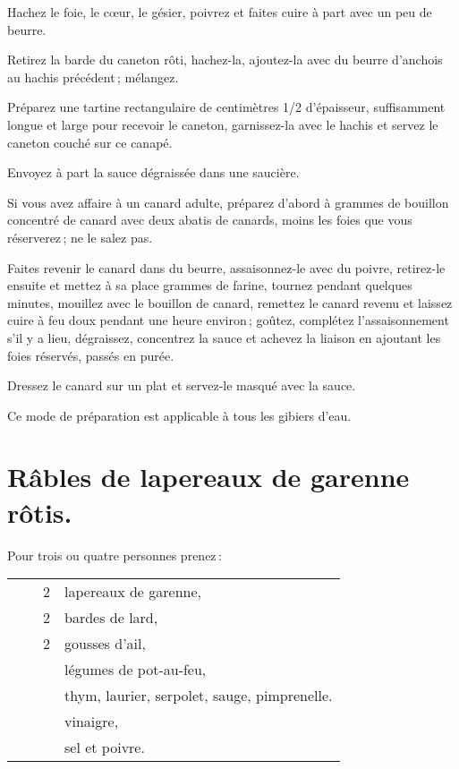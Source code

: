 Hachez le foie, le cœur, le gésier, poivrez et faites cuire à part avec un peu
de beurre.

Retirez la barde du caneton rôti, hachez-la, ajoutez-la avec du beurre
d'anchois au hachis précédent ; mélangez.

Préparez une tartine rectangulaire de {\mmm} centimètres 1/2 d'épaisseur,
suffisamment longue et large pour recevoir le caneton, garnissez-la avec le
hachis et servez le caneton couché sur ce canapé.

Envoyez à part la sauce dégraissée dans une saucière.

\sk

Si vous avez affaire à un canard adulte, préparez d'abord {\mmm}
à {\mmm} grammes de bouillon concentré de canard avec deux abatis de
canards, moins les foies que vous réserverez ; ne le salez pas.

Faites revenir le canard dans du beurre, assaisonnez-le avec du poivre,
retirez-le ensuite et mettez à sa place {\mmm} grammes de farine, tournez pendant
quelques minutes, mouillez avec le bouillon de canard, remettez le canard
revenu et laissez cuire à feu doux pendant une heure environ ; goûtez,
complétez l'assaisonnement s'il y a lieu, dégraissez, concentrez la sauce et
achevez la liaison en ajoutant les foies réservés, passés en purée.

Dressez le canard sur un plat et servez-le masqué avec la sauce.

\sk

Ce mode de préparation est applicable à tous les gibiers d'eau.

\section*{\centering Râbles de lapereaux de garenne rôtis.}
{}

Pour trois ou quatre personnes prenez :

\footnotesize
\begin{longtable}{rrrp{16em}}
        &         &  2 & lapereaux de garenne,                                                            \\
        &         &  2 & bardes de lard,                                                                  \\
        &         &  2 & gousses d'ail,                                                                   \\
        &         &    & légumes de pot-au-feu,                                                           \\
        &         &    & thym, laurier, serpolet, sauge, pimprenelle.                                     \\
        &         &    & vinaigre,                                                                        \\
        &         &    & sel et poivre.                                                                   \\
\end{longtable}
\normalsize

